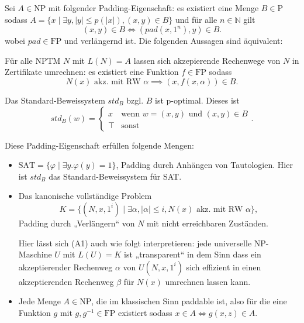 \documentclass[nofonts]{uebung}
\begin{document}
\renewcommand{\phi}{\varphi}
\noindent
Sei $A\in\mathrm {NP}$ mit folgender Padding-Eigenschaft:
es existiert eine Menge $B\in\mathrm P$ sodass $A=\{x\mid \exists y, |y|\leq p(|x|), (x,y)\in B\}$ und 
für alle $n\in\mathbb N$ gilt
\[ (x,y)\in B \iff (\mathit{pad}(x, 1^n), y)\in B. \]
wobei $\mathit{pad}\in\mathrm{FP}$ und verlängernd ist.
Die folgenden Aussagen sind äquivalent:
\begin{statements}
    \item Für alle NPTM $N$ mit $L(N)=A$ lassen sich akzepierende Rechenwege von $N$ in Zertifikate umrechnen: es existiert eine Funktion $f\in\mathrm{FP}$ sodass
        \[ N(x) \text{ akz. mit RW $\alpha$} \implies (x,f(x,\alpha))\in B. \]
    \item Das Standard-Beweissystem $\mathit{std}_B$ bzgl. $B$ ist p-optimal. Dieses ist
        \[ \mathit{std}_B(w) = \begin{cases} x & \text{wenn $w=(x,y)$ und $(x,y)\in B$}\\
        \top & \text{sonst}\end{cases}. \] 
\end{statements}

\begin{center}\ast\end{center}

\noindent
Diese Padding-Eigenschaft erfüllen folgende Mengen:
\begin{itemize}
    \item $\mathrm{SAT}=\{ \phi\mid \exists y. \phi(y)=1 \}$, Padding durch Anhängen von Tautologien.
        Hier ist $\mathit{std}_B$ das Standard-Beweissystem für SAT.
    \item Das kanonische vollständige Problem \[ K=\{ (N,x,1^i) \mid \exists \alpha, |\alpha|\leq i, N(x)\text{ akz. mit RW $\alpha$} \},\]Padding durch „Verlängern“ von $N$ mit nicht erreichbaren Zuständen.

        Hier lässt sich (A1) auch wie folgt interpretieren: jede universelle NP-Maschine $U$ mit $L(U)=K$ ist „transparent“ in dem Sinn dass ein akzeptierender Rechenweg $\alpha$ von $U(N,x,1^i)$ sich effizient in einen akzeptierenden Rechenweg $\beta$ für $N(x)$ umrechnen lassen kann.

    \item Jede Menge $A\in\mathrm{NP}$, die im klassischen Sinn paddable ist, also für die eine Funktion $g$ mit $g,g^{-1}\in\mathrm{FP}$ existiert sodass $x\in A \iff g(x,z)\in A$.
\end{itemize}
\end{document}
